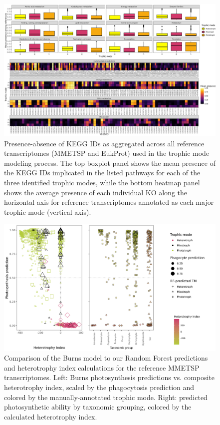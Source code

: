 \documentclass[12pt]{article}
\numberwithin{equation}{section}
\begin{document}
\begin{landscape}
\begin{figure}
    \centering
    \includegraphics[width=0.95\columnwidth]{si-figures/KO_figure_trophy.png}
    \caption{Presence-absence of KEGG IDs as aggregated across all reference transcriptomes (MMETSP and EukProt) used in the trophic mode modeling process. The top boxplot panel shows the mean presence of the KEGG IDs implicated in the listed pathways for each of the three identified trophic modes, while the bottom heatmap panel shows the average presence of each individual KO along the horizontal axis for reference transcriptomes annotated as each major trophic mode (vertical axis).}
    \label{fig:ko-trophy}
\end{figure}
\end{landscape}

\begin{figure}
    \centering
    \includegraphics[width=0.95\columnwidth]{si-figures/mmetsp_burns.png}
    \caption{Comparison of the Burns \cite{burns2018gene} model to our Random Forest predictions and heterotrophy index calculations for the reference MMETSP transcriptomes. Left: Burns \cite{burns2018gene} photosynthesis predictions vs. composite heterotrophy index, scaled by the phagocytosis prediction and colored by the manually-annotated trophic mode. Right: predicted photosynthetic ability by taxonomic grouping, colored by the calculated heterotrophy index.}
    \label{fig:mmetsp-burns}
\end{figure}
\end{document}
